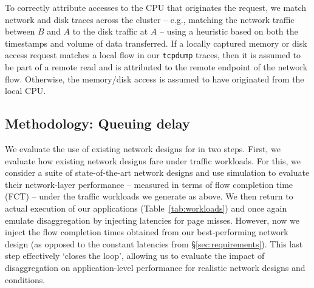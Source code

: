 To correctly attribute accesses to the CPU that originates the request, we match network and disk traces across the cluster -- e.g., matching the network traffic between $B$ and $A$ to the disk traffic at $A$ -- using a heuristic based on both the timestamps and volume of data transferred. 
If a locally captured memory or disk access request matches a local flow in our {\tt tcpdump} traces, then it is assumed to be part of a remote read and is attributed to the remote endpoint of the network flow.
Otherwise, the memory/disk access is assumed to have originated from the local CPU. 
%

\subsection{Methodology: Queuing delay}
\label{ssec:ssmethod}
We evaluate the use of existing network designs for \dis in two steps.
First, we evaluate how existing network designs fare under \dis traffic workloads. 
For this, we consider a suite of state-of-the-art network designs and use simulation to evaluate their network-layer performance -- measured in terms of flow completion time (FCT) -- under the traffic workloads we generate as above.
We then return to actual execution of our applications (Table~\ref{tab:workloads}) and once again emulate disaggregation by injecting latencies for page misses. 
However, now we inject the flow completion times obtained from our best-performing network design (as opposed to the constant latencies from \S\ref{sec:requirements}). This last step effectively `closes the loop', allowing us to evaluate the impact of disaggregation on application-level performance for realistic network designs and conditions. 

